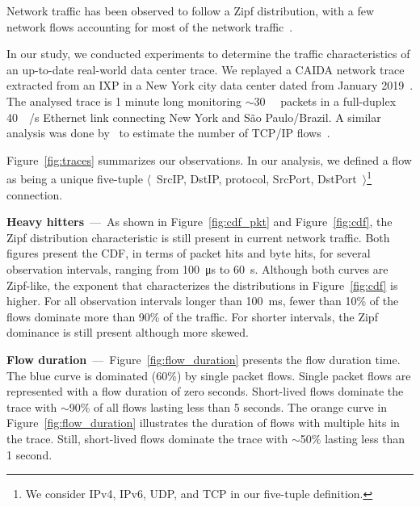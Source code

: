 Network traffic has been observed to follow a Zipf distribution, with a few network flows accounting for most of the network traffic~\cite{Sarrar:2012, Jin:2017}.

In our study, we conducted experiments to determine the traffic characteristics of an up-to-date real-world data center trace.
We replayed a CAIDA network trace extracted from an IXP in a New York city data center dated from January 2019~\cite{caida:19}.
The analysed trace is 1 minute long monitoring $\sim$\SI{30}{\mega\nothing} packets in a full-duplex \SI{40}{\giga\bit/\second} Ethernet link connecting New York and S\~ao Paulo/Brazil.
A similar analysis was done by~\citeauthor{Spang:19} to estimate the number of TCP/IP flows~\cite{Spang:19}.

Figure~\ref{fig:traces} summarizes our observations.
In our analysis, we defined a flow as being a unique five-tuple $\langle$~SrcIP, DstIP, protocol, SrcPort, DstPort~$\rangle$\footnote{We consider IPv4, IPv6, UDP, and TCP in our five-tuple definition.} connection.

\textbf{Heavy hitters}~---~As shown in Figure~\ref{fig:cdf_pkt} and Figure~\ref{fig:cdf}, the Zipf distribution characteristic is still present in current network traffic.
Both figures present the CDF, in terms of packet hits and byte hits, for several observation intervals, ranging from \SI{100}{\micro\second} to \SI{60}{\second}.
Although both curves are Zipf-like, the exponent that characterizes the distributions in Figure~\ref{fig:cdf} is higher.
For all observation intervals longer than \SI{100}{\milli\second}, fewer than 10\% of the flows dominate more than 90\% of the traffic.
For shorter intervals, the Zipf dominance is still present although more skewed.

\textbf{Flow duration}~---~Figure~\ref{fig:flow_duration} presents the flow duration time.
The blue curve is dominated (60\%) by single packet flows.
Single packet flows are represented with a flow duration of zero seconds.
Short-lived flows dominate the trace with $\sim$90\% of all flows lasting less than 5 seconds.
The orange curve in Figure~\ref{fig:flow_duration} illustrates the duration of flows with multiple hits in the trace.
Still, short-lived flows dominate the trace with $\sim$50\% lasting less than 1 second.%


